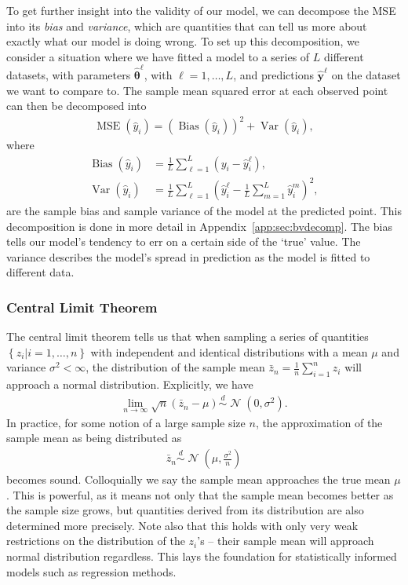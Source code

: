 \documentclass[twocolumn,english,notitlepage]{article}
\renewcommand{\vec}[1]{\boldsymbol{#1}}
\newcommand{\pclosed}[1]{\left(#1\right)}
\newcommand{\cclosed}[1]{\left\{#1\right\}}
\newcommand{\normal}[2]{\operatorname{\mathcal{N}}\pclosed{#1,#2}}
\newcommand{\distas}{\overset{d}{\sim}}
\DeclareMathOperator{\mse}{MSE}
\renewcommand{\var}{\operatorname{Var}}
\newcommand{\bias}{\operatorname{Bias}}
\begin{document}
        To get further insight into the validity of our model, we can decompose the MSE into its \textit{bias} and \textit{variance}, which are quantities that can tell us more about exactly what our model is doing wrong. To set up this decomposition, we consider a situation where we have fitted a model to a series of $L$ different datasets, with parameters $\vec{\hat{\theta}}^\ell$, with $\ell=1,\ldots,L$, and predictions $\vec{\hat{y}}^\ell$ on the dataset we want to compare to. The sample mean squared error at each observed point can then be decomposed into
        \begin{align}
            \mse(\hat{y}_i) = \pclosed{\bias(\hat{y}_i)}^2 + \var(\hat{y}_i),
        \end{align}
        where 
        \begin{subequations}
            \begin{align}
                \bias(\hat{y}_i) &= \frac{1}{L}\sum_{\ell=1}^L \pclosed{y_i - \hat{y}_i^\ell}, \\
                \var(\hat{y}_i) &= \frac{1}{L}\sum_{\ell=1}^L \pclosed{\hat{y}_i^\ell - \frac{1}{L} \sum_{m=1}^L \hat{y}_i^m }^2,
            \end{align}
            \label{theo:eq:bias and var}
        \end{subequations}
        are the sample bias and sample variance of the model at the predicted point. This decomposition is done in more detail in Appendix~\ref{app:sec:bvdecomp}. The bias tells our model's tendency to err on a certain side of the `true' value. The variance describes the model's spread in prediction as the model is fitted to different data.


    \subsubsection*{Central Limit Theorem}
        The central limit theorem tells us that when sampling a series of quantities $\cclosed{z_i|i=1,\ldots,n}$ with independent and identical distributions with a mean $\mu$ and variance $\sigma^2<\infty$, the distribution of the sample mean $\bar{z}_n = \frac{1}{n}\sum_{i=1}^n z_i$ will approach a normal distribution. Explicitly, we have
        \begin{align}\label{theo:eq:CLM}
            \lim_{n\to\infty} \sqrt{n}(\bar{z}_n-\mu) \distas \normal{0}{\sigma^2}.
        \end{align}
        In practice, for some notion of a large sample size $n$, the approximation of the sample mean as being distributed as
        \begin{align}
            \bar{z}_n \distas \normal{\mu}{\frac{\sigma^2}{n}}
        \end{align}
        becomes sound. Colloquially we say the sample mean approaches the true mean $\mu$. This is powerful, as it means not only that the sample mean becomes better as the sample size grows, but quantities derived from its distribution are also determined more precisely. Note also that this holds with only very weak restrictions on the distribution of the $z_i$'s -- their sample mean will approach normal distribution regardless. This lays the foundation for statistically informed models such as regression methods.
\end{document}
